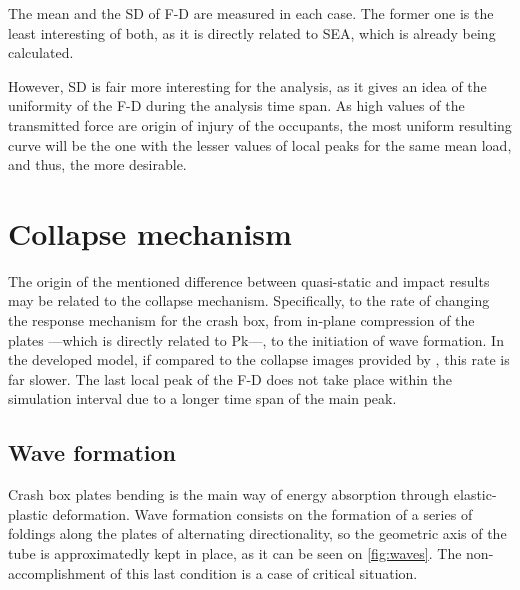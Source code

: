 \documentclass[
documentsize = a4, %
font = cmr, %
typesize = 11, %
printmode = true,
onehalfspacing = true,
language = en, %
titlepage = udciccp, %
degree = pt, %
dedication = true,
acknowledgements = true,
abstract-en = true,
abstract-es = false,
abstract-ga = false,
epigraphs = true,
toc = true,
lof = true,
lot = true,
frontmatterintoc = false,
notation = false,
minimal = false,
]{UDCthesis}
\begin{document}
The mean and the \gls{SD} of \gls{F-D} are measured in each case. The former one is the least interesting of both, as it is directly related to \gls{SEA}, which is already being calculated.

However, \gls{SD} is fair more interesting for the analysis, as it gives an idea of the uniformity of the \gls{F-D} during the analysis time span. As high values of the transmitted force are origin of injury of the occupants, the most uniform resulting curve will be the one with the lesser values of local peaks for the same mean load, and thus, the more desirable.

\section{Collapse mechanism}

The origin of the mentioned difference between quasi-static and impact results may be related to the collapse mechanism. Specifically, to the rate of changing the response mechanism for the crash box, from in-plane compression of the plates ---which is directly related to \gls{Pk}---, to the initiation of wave formation. In the developed model, if compared to the collapse images provided by \citet{Scattina2011}, this rate is far slower. The last local peak of the \gls{F-D} does not take place within the simulation interval due to a longer time span of the main peak.

\subsection{Wave formation}
\label{sec:wave_formation}

Crash box plates bending is the main way of energy absorption through elastic-plastic deformation. Wave formation consists on the formation of a series of foldings along the plates of alternating directionality, so the geometric axis of the tube is approximatedly kept in place, as it can be seen on \cref{fig:waves}. The non-accomplishment of this last condition is a case of critical situation.
\end{document}
